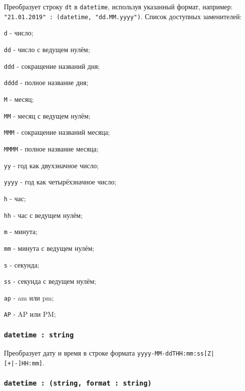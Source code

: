 Преобразует строку \texttt{dt} в \texttt{datetime}, используя указанный формат, например: \texttt{"21.01.2019" : (datetime, "dd.MM.yyyy")}. Список доступных заменителей:
\begin{icItems}
	\item \texttt{d} - число;
	\item \texttt{dd} - число с ведущем нулём;
	\item \texttt{ddd} - сокращение названий дня;
	\item \texttt{dddd} - полное название дня;
	\item \texttt{M} - месяц;
	\item \texttt{MM} - месяц с ведущем нулём;
	\item \texttt{MMM} - сокращение названий месяца;
	\item \texttt{MMMM} - полное название месяца;
	\item \texttt{yy} - год как двухзначное число;
	\item \texttt{yyyy} - год как четырёхзначное число;
	\item \texttt{h} - час;
	\item \texttt{hh} - час с ведущем нулём;
	\item \texttt{m} - минута;
	\item \texttt{mm} - минута с ведущем нулём;
	\item \texttt{s} - секунда;
	\item \texttt{ss} - секунда с ведущем нулём;
	\item \texttt{ap} - am или pm;
	\item \texttt{AP} - AP или PM;
\end{icItems}

\subsubsection{\texttt{datetime : string}}

Преобразует дату и время в строке формата \texttt{yyyy-MM-ddTHH:mm:ss[Z|[+|-]HH:mm]}.

\subsubsection{\texttt{datetime : (string, format : string)}}

